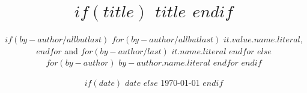 \title[$if(runningtitle)$ $runningtitle$ $else$ $title$ $endif$]{$if(title)$ $title$ $endif$}
\author[$if(runningauthor)$ $runningauthor$ $else$ $for(by-author/first)$ $by-author.name.literal$ $endfor$ $endif$]{
$if(by-author/allbutlast)$
  $for(by-author/allbutlast)$
    $it.value.name.literal$,
  $endfor$ and
  $for(by-author/last)$
    $it.name.literal$
  $endfor$  
$else$
  $for(by-author)$
    $by-author.name.literal$
  $endfor$
$endif$
}
\date[
  $if(date)$
    $date$
  $else$
    \today
  $endif$]{
  $if(date)$
    $date$
  $else$
    \today
  $endif$}
